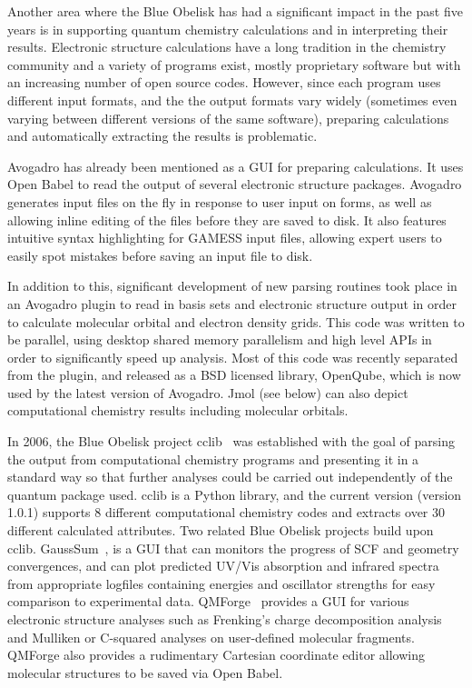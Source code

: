 \documentclass[10pt]{bmc_article}
\newenvironment{bmcformat}{\begin{raggedright}\baselineskip20pt\sloppy\setboolean{publ}{false}}{\end{raggedright}\baselineskip20pt\sloppy}
\begin{document}
\begin{bmcformat}
Another area where the Blue Obelisk has had a significant impact in the
past five years is in supporting
quantum chemistry calculations and in interpreting their results.
Electronic structure calculations have a long tradition in the
chemistry community and a variety of programs exist, mostly
proprietary software but with an increasing number of open source codes.
However, since each program uses different input formats, and the
the output formats vary widely (sometimes even varying between different versions
of the same software), preparing calculations and automatically extracting
the results is problematic. 

Avogadro has already been mentioned as a GUI for preparing calculations.
It uses Open Babel to read the output of several electronic structure
packages. Avogadro generates input files on the fly in response to user
input on forms, as well as allowing inline editing of the files before
they are saved to disk. It also features intuitive syntax highlighting
for GAMESS input files, allowing expert users to easily spot mistakes
before saving an input file to disk.

In addition to this, significant development of new parsing routines took
place in an Avogadro plugin to read in basis sets and electronic structure
output in order to calculate molecular orbital and electron density grids.
This code was written to be parallel, using desktop shared memory parallelism
and high level APIs in order to significantly speed up analysis. Most of this
code was recently separated from the plugin, and released as a BSD licensed
library, OpenQube, which is now used by the latest version of
Avogadro.
Jmol (see below)
can also depict computational chemistry results including molecular orbitals.

In 2006, the Blue Obelisk project cclib~\cite{cclib} was established
with the goal of parsing the output from computational chemistry
programs and presenting it in a standard way so that further analyses
could be carried out independently of the quantum package used.
cclib is a Python library, and the current version (version 1.0.1)
supports 8 different computational chemistry codes and extracts over
30 different calculated attributes. Two related Blue Obelisk projects build upon 
cclib. GaussSum~\cite{WebGaussSum},
is a GUI that can monitors the progress of SCF and geometry convergences, 
and can plot predicted UV/Vis absorption and infrared spectra from 
appropriate logfiles containing energies and oscillator strengths for easy 
comparison to experimental data. QMForge~\cite{WebQMForge} provides 
a GUI for various electronic structure analyses such as Frenking's charge 
decomposition analysis~\cite{Frenking} and Mulliken or C-squared analyses
on user-defined molecular fragments. QMForge also provides a rudimentary
Cartesian coordinate editor allowing molecular structures to be saved via Open Babel.


\end{bmcformat}
\end{document}
